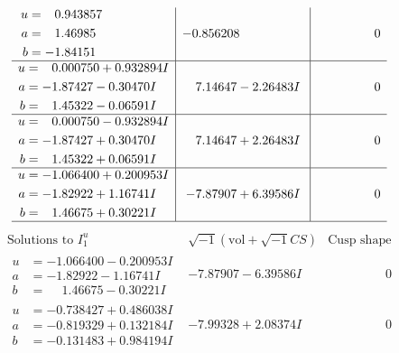 \documentclass[1p]{elsarticle_modified}
\theoremstyle{definition}
\newcommand{\I}{\sqrt{-1}}
\begin{document}
$$\begin{array}{c|c|c}
\begin{aligned}
u &= \phantom{-}0.943857\phantom{ +0.000000I} \\
a &= \phantom{-}1.46985\phantom{ +0.000000I} \\
b &= -1.84151\phantom{ +0.000000I}\end{aligned}
 & -0.856208\phantom{ +0.000000I} & \phantom{-0.000000 } 0 \\ \hline\begin{aligned}
u &= \phantom{-}0.000750 + 0.932894 I \\
a &= -1.87427 - 0.30470 I \\
b &= \phantom{-}1.45322 - 0.06591 I\end{aligned}
 & \phantom{-}7.14647 - 2.26483 I & \phantom{-0.000000 } 0 \\ \hline\begin{aligned}
u &= \phantom{-}0.000750 - 0.932894 I \\
a &= -1.87427 + 0.30470 I \\
b &= \phantom{-}1.45322 + 0.06591 I\end{aligned}
 & \phantom{-}7.14647 + 2.26483 I & \phantom{-0.000000 } 0 \\ \hline\begin{aligned}
u &= -1.066400 + 0.200953 I \\
a &= -1.82922 + 1.16741 I \\
b &= \phantom{-}1.46675 + 0.30221 I\end{aligned}
 & -7.87907 + 6.39586 I & \phantom{-0.000000 } 0\\
 \hline 
 \end{array}$$\newpage$$\begin{array}{c|c|c}  
\text{Solutions to }I^u_{1}& \I (\text{vol} + \sqrt{-1}CS) & \text{Cusp shape}\\
 \hline 
\begin{aligned}
u &= -1.066400 - 0.200953 I \\
a &= -1.82922 - 1.16741 I \\
b &= \phantom{-}1.46675 - 0.30221 I\end{aligned}
 & -7.87907 - 6.39586 I & \phantom{-0.000000 } 0 \\ \hline\begin{aligned}
u &= -0.738427 + 0.486038 I \\
a &= -0.819329 + 0.132184 I \\
b &= -0.131483 + 0.984194 I\end{aligned}
 & -7.99328 + 2.08374 I & \phantom{-0.000000 } 0 \\ \hline\begin{aligned}

\end{aligned}
\end{array}$$
\end{document}
